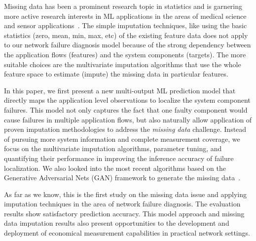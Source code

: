 Missing data has been a prominent research topic in statistics and is garnering more active research interests
 in ML applications in the areas of medical science~\cite{DONDERS20061087} and sensor applications~\cite{missingdata:sensor:20}.
 The simple imputation techniques, like using the basic statistics (zero, mean, min, max, etc) of the existing feature data does 
not apply to our network failure diagnosis model because of the strong dependency between the application flows (features) and the system components (targets).   
The more suitable choices are the multivariate imputation algorithms that use the whole feature space to estimate (impute) the missing data in particular features.

In this paper, we first present a new multi-output ML prediction model that directly maps the application level observations to localize the system component failures. 
This model not only captures the fact that one faulty component would cause failures in multiple application flows, but also naturally allow application of 
proven imputation methodologies to address the {\it missing data} challenge. Instead of pursuing more system information and complete measurement coverage, 
we focus on the multivariate imputation algorithms, parameter tuning, and quantifying their performance in improving the inference accuracy of failure localization.  
We also looked into the most recent algorithms based on the Generative Adversarial Nets (GAN) framework to generate the 
missing data~\cite{Yoon2018GAINMD,Awan2021ImputationOM}.

As far as we know, this is the first study on the missing data issue and applying imputation techniques in the area of network failure diagnosis. The evaluation results 
show satisfactory prediction accuracy. This model approach and missing data imputation results also present opportunities to the development and deployment of 
economical measurement capabilities in practical network settings.     









